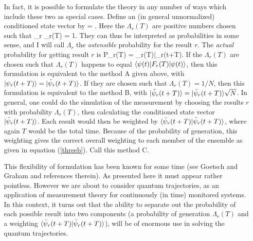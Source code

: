 \documentclass[12pt]{article}
\begin{document}
In fact, it is possible to formulate the theory in any number of ways which
include these two as special cases. Define an (in general unnormalized) conditioned
state vector by
\beq \label{threea}
 =  .
\eeq
Here the $\Lambda_r(T)$ are positive numbers chosen such that
\beq
\sum_r \Lambda_r(T) = 1.
\eeq
They can thus be interpreted as probabilities in some sense, and I will call
$\Lambda_r$ the {\em ostensible} probability for the result $r$. The
{\em actual} probability for getting result $r$ is 
\beq \label{threeb}
P_r(T) = \Lambda_r(T)\bar{\psi}_r(t+T)\rangle.
\eeq
If the $\Lambda_r(T)$ are chosen such that $\Lambda_r(T)$ happens to equal
$\langle {\psi(t)} |F_r(T)| {\psi(t)} \rangle$, then this formulation is equivalent to the
method A given above, with $| {\psi_r(t+T)} \rangle = | {\bar{\psi}_r(t+T)} \rangle$. If they
are chosen such that $\Lambda_r(T) = 1/N$, then this formulation is equivalent to
the method B, with
$| {\tilde\psi_r(t+T)} \rangle=| {\bar\psi_r(t+T)} \rangle\sqrt{N}$.  In general, one could do
the simulation of the measurement 
by choosing the results $r$ with probability $\Lambda_r(T)$, then calculating the
conditioned state vector $| {\bar{\psi}_r(t+T)} \rangle$. Each result would then be
weighted by $\langle {\bar{\psi}_r(t+T)} |\bar{\psi}_r(t+T)\rangle$, where again $T$ would
be the total time. Because of the probability of generation, this weighting gives the
correct overall weighting to each member of the ensemble as given in equation
(\ref{threeb}). Call this method C.

This flexibility of formulation has been known for some time (see Goetsch and
Graham \cite{GoeGra94b} and references therein). As presented here it must appear
rather pointless. However we are about to consider quantum trajectories, as an
application of measurement theory for continuously (in time) monitored systems.
In this context, it turns out that the ability to separate out the probability
of each possible result into two components (a probability of generation
$\Lambda_r(T)$ and a weighting $\langle {\bar{\psi}_r(t+T)} |\bar{\psi}_r(t+T)\rangle$),
will be of enormous use in solving the quantum trajectories. 
\end{document}
